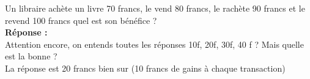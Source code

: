 Un libraire achète un livre 70 francs, le vend 80 francs, le rachète 90 
francs et le revend 100 francs quel est son bénéfice ?\\

\textbf{Réponse :}\\

Attention encore, on entends toutes les réponses 10f, 20f, 30f, 40 f ?
Mais quelle est la bonne ?\\

La réponse est 20 francs bien sur (10 francs de gains à chaque transaction)

